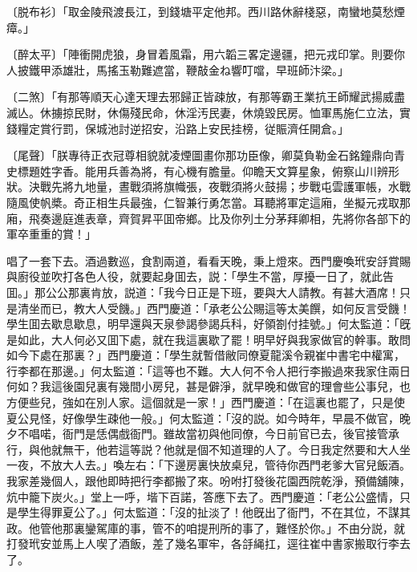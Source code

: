 \begin{myquote}
{\markfont〔脱布衫〕}「取金陵飛渡長江，到錢塘平定他邦。西川路休辭棧惡，南蠻地莫愁煙瘴。」

{\markfont〔醉太平〕}「陣衝開虎狼，身冒着風霜，用六韜三畧定邊疆，把元戎印掌。則要你人披鐵甲添雄壯，馬搖玉勒難遮當，鞭敲金ね響叮噹，早班師汴梁。」　

{\markfont〔二煞〕}「有那等順天心達天理去邪歸正皆疎放，有那等霸王業抗王師耀武揚威盡滅亾。休擄掠民財，休傷殘民命，休淫汚民妻，休燒毀民房。恤軍馬施仁立法，實錢糧定賞行罰，保城池討逆招安，沿路上安民挂榜，従賑濟任開倉。」

{\markfont〔尾聲〕}「朕專待正衣冠尊相貌就凌煙圖畫你那功臣像，卿莫負勒金石銘鐘鼎向青史標題姓字香。能用兵善為將，有心機有膽量。仰瞻天文算星象，俯察山川辨形狀。決戰先將九地量，晝戰須將旗幟張，夜戰須將火鼓揚；步戰屯雲護軍帳，水戰隨風使帆槳。奇正相生兵最強，仁智兼行勇怎當。耳聽將軍定這廂，坐擬元戎取那廂，飛奏邊庭進表章，齊賀昇平囬帝鄉。比及你列土分茅拜卿相，先將你各部下的軍卒重重的賞！」
\end{myquote}

唱了一套下去。酒過數巡，食割兩道，看看天晚，秉上燈來。西門慶喚玳安㧱賞賜與廚役並吹打各色人役，就要起身囬去，説：「學生不當，厚擾一日了，就此告囬。」那公公那裏肯放，説道：「我今日正是下班，要與大人請教。有甚大酒席！只是清坐而已，教大人受饑。」西門慶道：「承老公公賜這等太美饌，如何反言受饑！學生囬去歇息歇息，明早還與天泉參謁參謁兵科，好領劄付挂號。」何太監道：「旣是如此，大人何必又囬下處，就在我這裏歇了罷！明早好與我家做官的幹事。敢問如今下處在那裏？」西門慶道：「學生就暫借敝同僚夏龍溪令親崔中書宅中權寓，行李都在那邊。」何太監道：「這等也不難。大人何不令人把行李搬過來我家住兩日何如？我這後園兒裏有幾間小房兒，甚是僻淨，就早晚和做官的理會些公事兒，也方便些兒，強如在別人家。這個就是一家！」西門慶道：「在這裏也罷了，只是使夏公見怪，好像學生疎他一般。」何太監道：「沒的説。如今時年，早晨不做官，晚夕不唱喏，衙門是恁偶戲衙門。雖故當初與他同僚，今日前官已去，後官接管承行，與他就無干，他若這等説？他就是個不知道理的人了。今日我定然要和大人坐一夜，不放大人去。」喚左右：「下邊房裏快放桌兒，管待你西門老爹大官兒飯酒。我家差幾個人，跟他即時把行李都搬了來。吩咐打發後花園西院乾淨，預備舖陳，炕中籠下炭火。」堂上一呼，堦下百諾，答應下去了。西門慶道：「老公公盛情，只是學生得罪夏公了。」何太監道：「沒的扯淡了！他旣出了衙門，不在其位，不謀其政。他管他那裏鑾駕庫的事，管不的咱提刑所的事了，難怪於你。」不由分説，就打發玳安並馬上人喫了酒飯，差了幾名軍牢，各㧱䋲扛，逕往崔中書家搬取行李去了。

